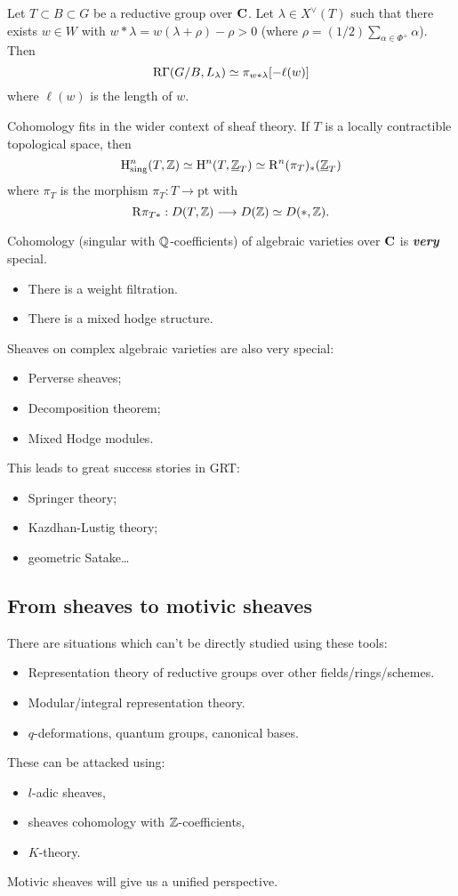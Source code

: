 \begin{example}
	Let $T\subset B\subset G$ be a reductive group over $\mathbf{C}$. Let $\lambda\in X^{\vee}(T)$ such that there exists $w\in W$ with $w*\lambda = w(\lambda+\rho)-\rho>0$ (where $\rho = (1 /2)\sum_{\alpha\in \Phi^{+}}\alpha$). Then
	\[
		\mathrm{R}\Gamma(G /B,L_\lambda) \simeq \pi_{w*\lambda}[-\ell(w)]
	\] 
	where $\ell(w)$ is the length of $w$.
\end{example}
Cohomology fits in the wider context of sheaf theory. If $T$ is a locally contractible topological space, then
\[
	\mathrm{H}^{n}_{\text{sing}}(T,\mathbb Z) \simeq \mathrm{H}^{n}(T,\underline{\mathbb{Z}}_T) \simeq \mathrm{R}^{n}(\pi_T)_*(\underline{\mathbb{Z}}_T)	
\]
where $\pi_T$ is the morphism $\pi_T:T\to \text{pt}$ with
\[
\RD\pi_{T*}:D(T,\Z) \to D(\Z) \isoto D(*,\Z)
.\] 

Cohomology (singular with $\mathbb Q$-coefficients) of algebraic varieties over $\mathbf{C}$ is \emph{\textbf{very}} special.
\begin{itemize}
	\item There is a weight filtration.
	\item There is a mixed hodge structure.
\end{itemize}
Sheaves on complex algebraic varieties are also very special:
\begin{itemize}
	\item Perverse sheaves;
	\item Decomposition theorem;
	\item Mixed Hodge modules.
\end{itemize}
This leads to great success stories in GRT:
\begin{itemize}
	\item Springer theory;
	\item Kazdhan-Lustig theory;
	\item geometric Satake\dots
\end{itemize}

\subsection{From sheaves to motivic sheaves}
There are situations which can't be directly studied using these tools:
\begin{itemize}
	\item Representation theory of reductive groups over other fields/rings/schemes.
	\item Modular/integral representation theory.
	\item $q$-deformations, quantum groups, canonical bases.
\end{itemize}
These can be attacked using:
\begin{itemize}
	\item $l$-adic sheaves,
	\item sheaves cohomology with $\mathbb Z$-coefficients,
	\item $K$-theory.
\end{itemize}
Motivic sheaves will give us a unified perspective.

